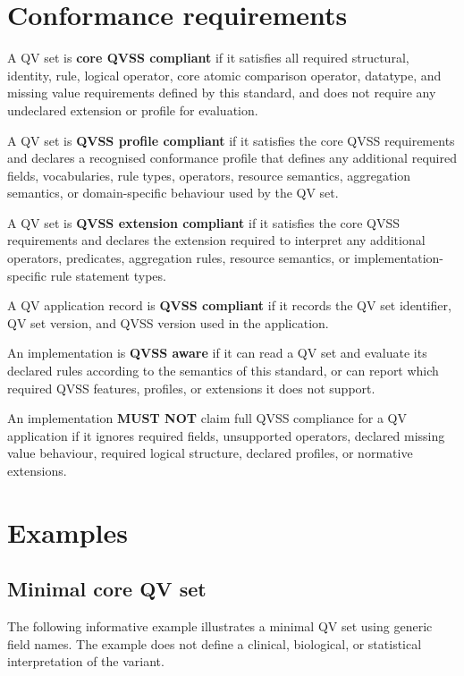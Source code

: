 \documentclass[11pt,a4paper]{article}
\begin{document}
\section{Conformance requirements}

A QV set is \textbf{core QVSS compliant} if it satisfies all required structural, identity, rule, logical operator, core atomic comparison operator, datatype, and missing value requirements defined by this standard, and does not require any undeclared extension or profile for evaluation.

A QV set is \textbf{QVSS profile compliant} if it satisfies the core QVSS requirements and declares a recognised conformance profile that defines any additional required fields, vocabularies, rule types, operators, resource semantics, aggregation semantics, or domain-specific behaviour used by the QV set.

A QV set is \textbf{QVSS extension compliant} if it satisfies the core QVSS requirements and declares the extension required to interpret any additional operators, predicates, aggregation rules, resource semantics, or implementation-specific rule statement types.

A QV application record is \textbf{QVSS compliant} if it records the QV set identifier, QV set version, and QVSS version used in the application.

An implementation is \textbf{QVSS aware} if it can read a QV set and evaluate its declared rules according to the semantics of this standard, or can report which required QVSS features, profiles, or extensions it does not support.

An implementation \textbf{MUST NOT} claim full QVSS compliance for a QV application if it ignores required fields, unsupported operators, declared missing value behaviour, required logical structure, declared profiles, or normative extensions.

\section{Examples}

\subsection{Minimal core QV set}

The following informative example illustrates a minimal QV set using generic field names. The example does not define a clinical, biological, or statistical interpretation of the variant.
\end{document}
